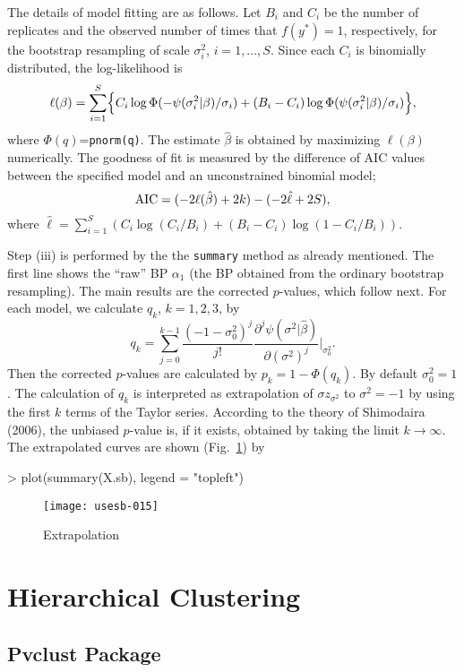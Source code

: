 \documentclass[a4paper]{amsart}
\begin{document}
The details of model fitting are as follows. Let $B_i$ and $C_i$ be
the number of replicates and the observed number of times that
$f(y^*)=1$, respectively, for the bootstrap resampling of scale
$\sigma^2_i$, $i=1,\ldots,S$. Since each $C_i$ is binomially
distributed, the log-likelihood is
\[
\ell(\beta) = \sum_{i=1}^S \Bigl\{
C_i \log \Phi(-\psi(\sigma^2_i|\beta)/\sigma_i)+
(B_i - C_i) \log \Phi(\psi(\sigma^2_i|\beta)/\sigma_i)
\Bigr\},
\]
where $\Phi(q)$={\tt pnorm(q)}. The estimate $\hat\beta$ is obtained
by maximizing $\ell(\beta)$ numerically.  The goodness of fit is
measured by the difference of AIC values between the specified model
and an unconstrained binomial model;
\[
{\rm AIC} = ( -2\ell(\hat\beta)+2k ) - (-2\hat\ell + 2S),
\]
where $\hat\ell = \sum_{i=1}^S ( C_i\log(C_i/B_i) +
(B_i-C_i)\log(1-C_i/B_i)) $.


Step (iii) is performed by the the {\tt summary} method as already
mentioned. The first line shows the ``raw'' BP $\alpha_1$ (the BP
obtained from the ordinary bootstrap resampling).  The main results
are the corrected $p$-values, which follow next. For each model, we
calculate $q_k$, $k=1,2,3$, by
\[
q_k = \sum_{j=0}^{k-1} \frac{(-1-\sigma_0^2)^j}{j!}
\frac{\partial^j \psi(\sigma^2|\hat\beta)}{\partial (\sigma^2)^j}
\Bigr|_{\sigma_0^2}.
\]
Then the corrected $p$-values are calculated by $p_k=1-\Phi(q_k)$.  By
default $\sigma_0^2=1$. The calculation of $q_k$ is interpreted as
extrapolation of $\sigma z_{\sigma^2}$ to $\sigma^2=-1$ by using the
first $k$ terms of the Taylor series. According to the theory of
Shimodaira (2006), the unbiased $p$-value is, if it exists, obtained
by taking the limit $k\to\infty$. The extrapolated curves are shown
(Fig.~\ref{fig:diag1s}) by
\begin{Schunk}
\begin{Sinput}
> plot(summary(X.sb), legend = "topleft")
\end{Sinput}
\end{Schunk}
\begin{figure}
\begin{center}
\texttt{[image: usesb-015]}
\caption{Extrapolation}\label{fig:diag1s}
\end{center}
\end{figure}


\section{Hierarchical Clustering}

\subsection{Pvclust Package}
\end{document}
